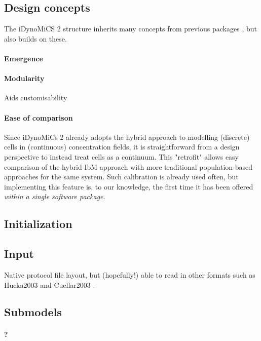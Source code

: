 \documentclass[10pt,letterpaper]{article}
\begin{document}
\subsection*{Design concepts}
The iDynoMiCS 2 structure inherits many concepts from previous packages \cite{Kreft1998, Lardon2011}, but also builds on these.
\paragraph{Emergence}


\paragraph{Modularity}
Aids customisability

\paragraph{Ease of comparison}
Since iDynoMiCs 2 already adopts the hybrid approach to modelling (discrete) cells in (continuous) concentration fields, it is straightforward from a design perspective to instead treat cells as a continuum. This "retrofit" allows easy comparison of the hybrid IbM approach with more traditional population-based approaches \cite{wanner1986}
for the same system. Such calibration is already used often,
but implementing this feature is, to our knowledge, the first time it has been offered \textit{within a single software package}.

\subsection*{Initialization}

\subsection*{Input}
Native protocol file layout, but (hopefully!) able to read in other formats such as Hucka2003 \cite{Hucka2003} and Cuellar2003 \cite{Cuellar2003}.


\subsection*{Submodels}
\paragraph{?}
\end{document}

